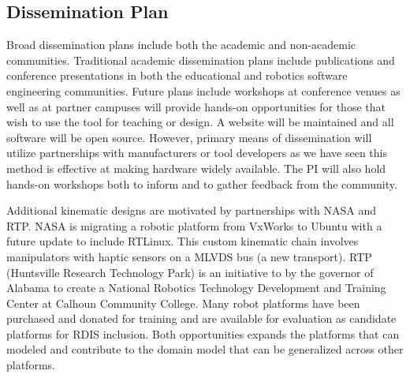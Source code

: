 \subsection{Dissemination Plan}
Broad dissemination plans include both the academic and non-academic communities.  Traditional academic dissemination plans include publications and conference presentations in both the educational and robotics software engineering communities.  Future plans include workshops at conference venues as well as at partner campuses will provide hands-on opportunities for those that wish to use the tool for teaching or design.  A website will be maintained and all software will be open source.  However, primary means of dissemination will utilize partnerships with manufacturers or tool developers as we have seen this method is effective at making hardware widely available.  The PI will also hold hands-on workshops both to inform and to gather feedback from the community.  

Additional kinematic designs are motivated by partnerships with NASA and RTP.  NASA is migrating a robotic platform from VxWorks to Ubuntu with a future update to include RTLinux.  This custom kinematic chain involves manipulators with haptic sensors on a MLVDS bus (a new transport).  RTP (Huntsville Research Technology Park) is an initiative to by the governor of Alabama to create a National Robotics Technology Development and Training Center at Calhoun Community College.  Many robot platforms have been purchased and donated for training and are available for evaluation as candidate platforms for RDIS inclusion.  Both opportunities expands the platforms that can modeled and contribute to the domain model that can be generalized across other platforms. 

